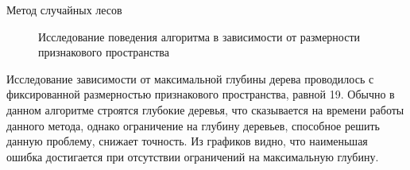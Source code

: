 \documentclass[12pt]{article}
\begin{document}
\begin{section}{Метод случайных лесов}
\begin{figure}[h!]
\begin{minipage}[h]{0.5\linewidth}
\end{minipage}
\caption{Исследование поведения алгоритма в зависимости от размерности признакового пространства}
\label{ris:image1}
\end{figure}

\newpage
Исследование зависимости от максимальной глубины дерева проводилось с фиксированной размерностью признакового пространства, равной 19. Обычно в данном алгоритме строятся глубокие деревья, что сказывается на времени работы данного метода, однако ограничение на глубину деревьев, способное решить данную проблему, снижает точность. Из графиков видно, что наименьшая ошибка достигается при отсутствии ограничений на максимальную глубину. 

\begin{figure}[h]
\begin{minipage}[h]{0.5\linewidth}
\end{minipage}
\hfill
\begin{minipage}[h]{0.5\linewidth}

\end{minipage}
\end{figure}
\end{section}
\end{document}
